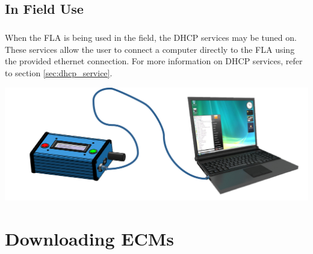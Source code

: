 \documentclass[11pt, oneside]{book}
\begin{document}
\section{In Field Use}\label{setting_fla_in_field}
\paragraph{  }
When the FLA is being used in the field, the DHCP services may be tuned on. These services allow the user to connect a computer directly to the FLA using the provided ethernet connection. For more information on DHCP services, refer to section \ref{sec:dhcp_service}.
\begin{center}
\includegraphics[width=.9\linewidth]{../media/graphics/fla_in_field}
\end{center}
\chapter{Downloading ECMs}
\end{document}
